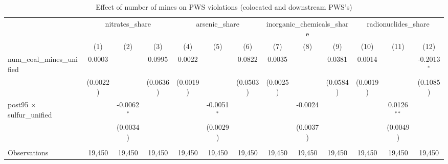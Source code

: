 
\begin{table}[htbp]
   \caption{\label{olsrf2sls_nummine_mine_vio_1985to2005colocateddownstream_coalunified} Effect of number of mines on PWS violations (colocated and downstream PWS's)}
   \bigskip
   \centering
   \begin{adjustbox}{width = \textwidth, center}
      \begin{tabular}{lcccccccccccc}
         \toprule
          & \multicolumn{3}{c}{nitrates\_share} & \multicolumn{3}{c}{arsenic\_share} & \multicolumn{3}{c}{inorganic\_chemicals\_share} & \multicolumn{3}{c}{radionuclides\_share}\\
                                                          & (1)                   & (2)           & (3)           & (4)           & (5)           & (6)           & (7)           & (8)                   & (9)                   & (10)                  & (11)          & (12)\\  
         \midrule 
         num\_coal\_mines\_unified                        & 0.0003                &               & 0.0995        & 0.0022        &               & 0.0822        & 0.0035        &                       & 0.0381                & 0.0014                &               & -0.2013$^{*}$\\   
                                                          & (0.0022)              &               & (0.0636)      & (0.0019)      &               & (0.0503)      & (0.0025)      &                       & (0.0584)              & (0.0019)              &               & (0.1085)\\   
         post95 $\times$ sulfur\_unified                  &                       & -0.0062$^{*}$ &               &               & -0.0051$^{*}$ &               &               & -0.0024               &                       &                       & 0.0126$^{**}$ &   \\   
                                                          &                       & (0.0034)      &               &               & (0.0029)      &               &               & (0.0037)              &                       &                       & (0.0049)      &   \\   
          \\
         Observations                                     & 19,450                & 19,450        & 19,450        & 19,450        & 19,450        & 19,450        & 19,450        & 19,450                & 19,450                & 19,450                & 19,450        & 19,450\\  

\end{tabular}
\end{adjustbox}
\end{table}
